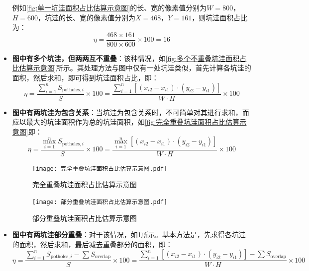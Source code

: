 \documentclass{MathorCupmodeling}
\begin{document}
\begin{itemize}
		例如\textcolor{blue}{\cref{fig:单一坑洼面积占比估算示意图}}的长、宽的像素值分别为$W=800$，$H=600$，坑洼的长、宽的像素值分别为$X=468$，$Y=161$，则坑洼面积占比为：
		\begin{equation}
			\eta=\frac{468\times 161}{800\times 600}\times 100=16
		\end{equation}
		\item \textbf{图中有多个坑洼，但两两互不重叠}：该种情况，如\textcolor{blue}{\cref{fig:多个不重叠坑洼面积占比估算示意图}}所示。其处理方法与图中仅有一处坑洼类似，首先计算各坑洼的面积，然后求和，即可得到坑洼面积占比，即：
		\begin{equation}
			\eta=\frac{\sum\limits_{i=1}^nS_{\text{potholes},i}}{S}\times 100=\frac{\sum\limits_{i=1}^n\left[\left(x_{i2}-x_{i1}\right)\cdot\left(y_{i2}-y_{i1}\right)\right]}{W\cdot H}\times 100
		\end{equation}
		\item \textbf{图中有两坑洼为包含关系}：当坑洼为包含关系时，不可简单对其进行求和，而应以最大的坑洼面积作为总的坑洼面积，如\textcolor{blue}{\cref{fig:完全重叠坑洼面积占比估算示意图}}即：
		\begin{equation}
			\eta=\frac{\max\limits_{i=1}^nS_{\text{potholes},i}}{S}\times 100=\frac{\max\limits_{i=1}^n\left[\left(x_{i2}-x_{i1}\right)\cdot\left(y_{i2}-y_{i1}\right)\right]}{W\cdot H}\times 100
		\end{equation}
		\begin{figure}[H]
			\centering
			\begin{minipage}{0.45\linewidth}
			  \centering
			  \texttt{[image: 完全重叠坑洼面积占比估算示意图.pdf]}
			  \caption{完全重叠坑洼面积占比估算示意图}
			  \label{fig:完全重叠坑洼面积占比估算示意图}
			\end{minipage}
			\begin{minipage}{0.45\linewidth}
			  \centering
			  \texttt{[image: 部分重叠坑洼面积占比估算示意图.pdf]}
			  \caption{部分重叠坑洼面积占比估算示意图}
			  \label{fig:部分重叠坑洼面积占比估算示意图}
			\end{minipage}
		\end{figure}
		\item \textbf{图中有两坑洼部分重叠}：对于该情况，如\textcolor{blue}{\cref{fig:部分重叠坑洼面积占比估算示意图}}所示。基本方法是，先求得各坑洼的面积，然后求和，最后减去重叠部分的面积，即：
		\begin{equation}
			\eta=\frac{\sum\limits_{i=1}^nS_{\text{potholes},i}-\sum S_{\text{overlap}}}{S}\times 100=\frac{\sum\limits_{i=1}^n\left[\left(x_{i2}-x_{i1}\right)\cdot\left(y_{i2}-y_{i1}\right)\right]-\sum S_{\text{overlap}}}{W\cdot H}\times 100
		\end{equation}
	

\end{itemize}
\end{document}
